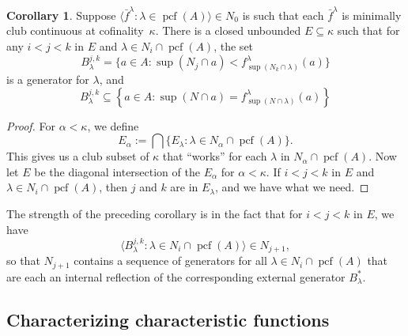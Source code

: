 \documentclass[10pt]{amsart}
\theoremstyle{plain}
\theoremstyle{definition}
\newtheorem{corollary}[proposition]{Corollary}
\theoremstyle{remark}
\DeclareMathOperator{\pcf}{pcf}
\numberwithin{equation}{section}
\begin{document}
\begin{corollary}
\label{cor:ReflGenCor}
Suppose $\langle \bar{f}^\lambda:\lambda\in\pcf(A)\rangle\in N_0$ is such that each $\bar{f}^\lambda$ is minimally club continuous at
cofinality~$\kappa$. There is a closed unbounded $E\subseteq\kappa$ such that for any $i<j<k$ in $E$ and $\lambda\in N_i\cap\pcf(A)$,
the set
\begin{equation}
B^{j, k}_\lambda = \{a\in A: \sup(N_j\cap a)<f^\lambda_{\sup(N_k\cap\lambda)}(a)\}
\end{equation}
is a generator for $\lambda$, and
\begin{equation}
B^{j,k}_\lambda\subseteq\left\{a\in A:\sup(N\cap a)= f^\lambda_{\sup(N\cap\lambda)}(a)\right\}
\end{equation}
\end{corollary}
\begin{proof}
For $\alpha<\kappa$, we define
\begin{equation}
E_\alpha:= \bigcap\{E_\lambda:\lambda\in N_\alpha\cap\pcf(A)\}.
\end{equation}
This gives us a club subset of $\kappa$ that ``works'' for each $\lambda$ in $N_\alpha\cap\pcf(A)$.  Now let $E$
be the diagonal intersection of the $E_\alpha$ for $\alpha<\kappa$.  If $i<j<k$ in $E$ and $\lambda\in N_i\cap\pcf(A)$, then
$j$ and $k$ are in $E_\lambda$, and we have what we need.
\end{proof}

The strength of the preceding corollary is in the fact that for $i<j<k$ in $E$, we have
\begin{equation}
\langle B^{j,k}_\lambda:\lambda\in N_i\cap\pcf(A)\rangle\in N_{j+1},
\end{equation}
so that $N_{j+1}$ contains a sequence of generators for all $\lambda\in N_i\cap\pcf(A)$ that are each an internal reflection
of the corresponding external generator $B_\lambda^*$.



\subsection{Characterizing characteristic functions}
\end{document}
